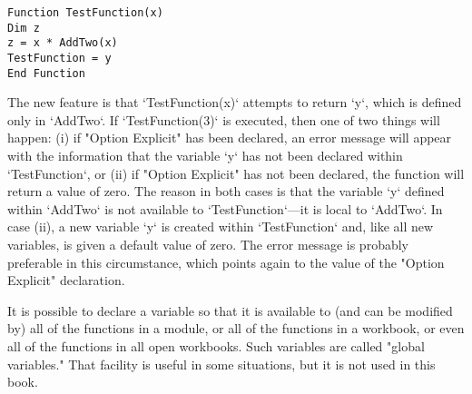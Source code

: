 \small\begin{verbatim}
Function TestFunction(x)
Dim z
z = x * AddTwo(x)
TestFunction = y
End Function
\end{verbatim}\normalsize
The new feature is that `TestFunction(x)` attempts to return `y`, which
is defined only in `AddTwo`. If `TestFunction(3)` is executed, then one
of two things will happen: (i) if "Option Explicit" has been declared,
an error message will appear with the information that the variable `y`
has not been declared within `TestFunction`, or (ii) if "Option
Explicit" has not been declared, the function will return a value of
zero. The reason in both cases is that the variable `y` defined within
`AddTwo` is not available to `TestFunction`---it is local to `AddTwo`.
In case (ii), a new variable `y` is created within `TestFunction` and,
like all new variables, is given a default value of zero. The error
message is probably preferable in this circumstance, which points again
to the value of the "Option Explicit" declaration.

It is possible to declare a variable so that it is available to (and can
be modified by) all of the functions in a module, or all of the
functions in a workbook, or even all of the functions in all open
workbooks. Such variables are called "global variables." That facility
is useful in some situations, but it is not used in this book.

